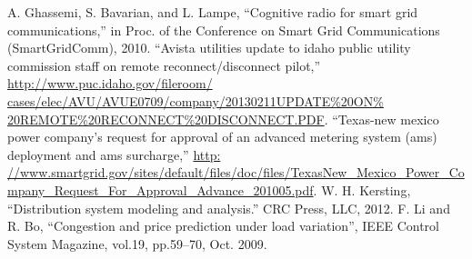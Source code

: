 \documentclass[11pt,oneside]{book}
\begin{document}
\begin{thebibliography}{99}
 A. Ghassemi, S. Bavarian, and L. Lampe, ``Cognitive radio for smart grid communications,'' in Proc. of the Conference on Smart Grid Communications (SmartGridComm), 2010.
 ``Avista utilities update to idaho public utility commission staff on remote reconnect/disconnect pilot,'' \url{http://www.puc.idaho.gov/fileroom/ cases/elec/AVU/AVUE0709/company/20130211UPDATE\%20ON\% 20REMOTE\%20RECONNECT\%20DISCONNECT.PDF}.
 ``Texas-new mexico power company’s request for approval of an advanced metering system (ams) deployment and ams surcharge,'' \url{http: //www.smartgrid.gov/sites/default/files/doc/files/TexasNew_Mexico_Power_Company_Request_For_Approval_Advance_201005.pdf}.
 W. H. Kersting, ``Distribution system modeling and analysis.'' CRC Press, LLC, 2012.
 F. Li and R. Bo, ``Congestion and price prediction under load variation'', IEEE Control System Magazine, vol.19, pp.59–70, Oct. 2009.
\end{thebibliography}
\end{document}

